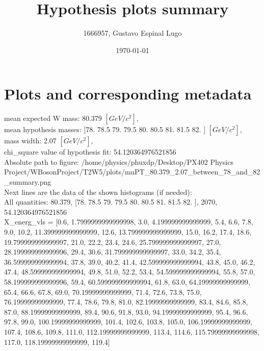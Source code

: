\documentclass[12pt]{article}
\begin{document}
	\title{Hypothesis plots summary} %
	\author{1666957, Gustavo Espinal Lugo}
	\date{\today} %

	\maketitle
	
	\section*{Plots and corresponding metadata}
	mean expected W mass: 80.379 $[GeV/c^{2}]$,\\
mean hypothesis masses: [78.  78.5 79.  79.5 80.  80.5 81.  81.5 82. ] $[GeV/c^{2}]$,\\
mass width: 2.07 $[GeV/c^{2}]$,\\
chi\_square value of hypothesis fit: 54.120364976521856\\
	Absolute path to figure: /home/physics/phuxdp/Desktop/PX402 Physics Project/WBosonProject/T2W5/plots/muPT\_80.379\_2.07\_between\_78\_and\_82\_summary.png\\
	Next lines are the data of the shown histograms (if needed): \\
	All quantities: 	80.379, [78.  78.5 79.  79.5 80.  80.5 81.  81.5 82. ], 2070, 54.120364976521856\\
	X\_energ\_vls = [0.6, 1.7999999999999998, 3.0, 4.199999999999999, 5.4, 6.6, 7.8, 9.0, 10.2, 11.399999999999999, 12.6, 13.799999999999999, 15.0, 16.2, 17.4, 18.6, 19.799999999999997, 21.0, 22.2, 23.4, 24.6, 25.799999999999997, 27.0, 28.199999999999996, 29.4, 30.6, 31.799999999999997, 33.0, 34.2, 35.4, 36.599999999999994, 37.8, 39.0, 40.2, 41.4, 42.599999999999994, 43.8, 45.0, 46.2, 47.4, 48.599999999999994, 49.8, 51.0, 52.2, 53.4, 54.599999999999994, 55.8, 57.0, 58.199999999999996, 59.4, 60.599999999999994, 61.8, 63.0, 64.19999999999999, 65.4, 66.6, 67.8, 69.0, 70.19999999999999, 71.4, 72.6, 73.8, 75.0, 76.19999999999999, 77.4, 78.6, 79.8, 81.0, 82.19999999999999, 83.4, 84.6, 85.8, 87.0, 88.19999999999999, 89.4, 90.6, 91.8, 93.0, 94.19999999999999, 95.4, 96.6, 97.8, 99.0, 100.19999999999999, 101.4, 102.6, 103.8, 105.0, 106.19999999999999, 107.4, 108.6, 109.8, 111.0, 112.19999999999999, 113.4, 114.6, 115.79999999999998, 117.0, 118.19999999999999, 119.4]\\
\end{document}
